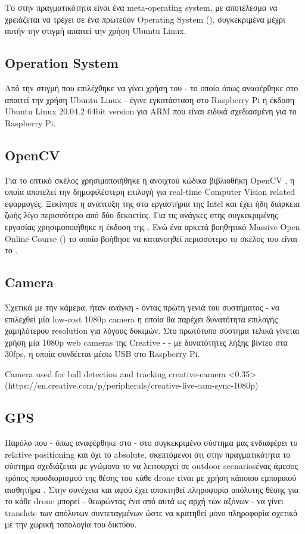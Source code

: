 Το  στην πραγματικότητα είναι ένα meta-operating system, με αποτέλεσμα να χρειάζεται να τρέχει σε ένα πρωτεύον Operating System (), συγκεκριμένα μέχρι αυτήν την στιγμή απαιτεί την χρήση Ubuntu Linux. 


\subsection{Operation System}
Από την στιγμή που επιλέχθηκε να γίνει χρήση του  - το οποίο όπως αναφέρθηκε στο  απαιτεί την χρήση Ubuntu Linux - έγινε εγκατάσταση στο Raspberry Pi η έκδοση Ubuntu Linux 20.04.2 64bit version για ΑRM \cite{ubuntu-raspberry} που είναι ειδικά σχεδιασμένη για το Raspberry Pi.

\subsection{OpenCV}
Για το οπτικό σκέλος χρησιμοποιήθηκε η ανοιχτού κώδικα βιβλιοθήκη OpenCV \cite{opencv}, η οποία αποτελεί την δημοφιλέστερη επιλογή για real-time Computer Vision related εφαρμογές. Ξεκίνησε η ανάπτυξη της στα εργαστήρια της Intel και έχει ήδη διάρκεια ζωής λίγο περισσότερο από δύο δεκαετίες. Για τις ανάγκες στης συγκεκριμένης εργασίας χρησιμοποιήθηκε η έκδοση της . Ενώ ένα αρκετά βοηθητικό Massive Open Online Course () το οποίο βοήθησε να κατανοηθεί περισσότερο το σκέλος του  είναι το \cite{introduction-to-computer-vision}.

\subsection{Camera}
Σχετικά με την κάμερα, ήταν ανάγκη - όντας πρώτη γενιά του συστήματος -  να επιλεχθεί μία low-cost 1080p camera η οποία θα παρέχει δυνατότητα επιλογής χαμηλότερου resolution για λόγους δοκιμών. Στο πρωτότυπο σύστημα τελικά γίνεται χρήση μία 1080p web cameras της Creative \cite{creative-camera} -  - με δυνατότητες λήξης βίντεο στα 30fps, η οποία συνδέεται μέσω USB στο Raspberry Pi.

%
{Camera used for ball detection and tracking}%
{creative-camera}%
<0.35>%
(https://en.creative.com/p/peripherals/creative-live-cam-sync-1080p)


\subsection{GPS}
Παρόλο που - όπως αναφέρθηκε στο  - στο συγκεκριμένο σύστημα μας ενδιαφέρει το relative positioning και όχι το absolute, σκεπτόμενοι ότι στην πραγματικότητα το σύστημα σχεδιάζεται με γνώμονα το να λειτουργεί σε outdoor scenarios\udot ένας άμεσος τρόπος προσδιορισμού της θέσης του κάθε drone είναι με χρήση κάποιου εμπορικού αισθητήρα . Στην συνέχεια και αφού έχει αποκτηθεί πληροφορία απόλυτης θέσης για το κάθε drone μπορεί - θεωρώντας ένα από αυτά ως αρχή των αξόνων - να γίνει translate των απόλυτων συντεταγμένων ώστε να κρατηθεί μόνο πληροφορία σχετικά με την χωρική τοπολογία του δικτύου.

